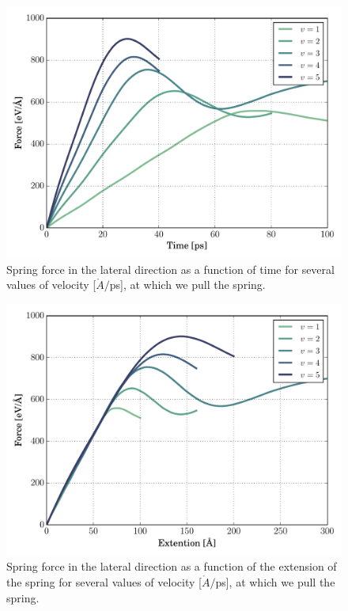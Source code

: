 \documentclass[twoside,english]{uiofysmaster}
\begin{document}
\raggedbottom
\newpage			%
\flushbottom



\begin{figure}[H]
\centering
\includegraphics[width=0.7\linewidth]{figures/friction/scalingCoeffisient/UnScaledSliding}
\caption{Spring force in the lateral direction as a function of time for several values of velocity [$\mathring{A}/$ps], at which we pull the spring.}
\label{fig:springUnScaled}
\end{figure}

\begin{figure}[H]
\centering
\includegraphics[width=0.7\linewidth]{figures/friction/scalingCoeffisient/UnScaledExtention}
\caption{Spring force in the lateral direction as a function of the extension of the spring for several values of velocity [$\mathring{A}/$ps], at which we pull the spring.}
\label{fig:springUnScaledExtension}
\end{figure}
\end{document}
